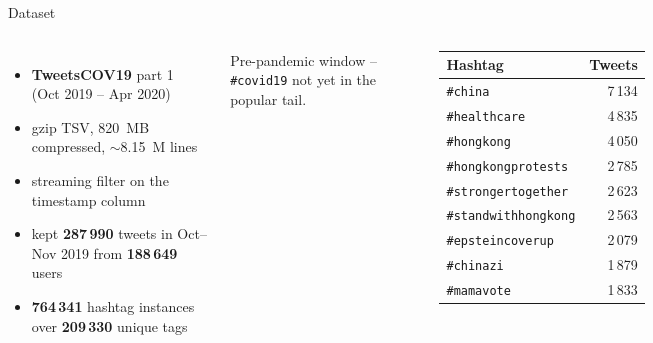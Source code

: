 \documentclass[aspectratio=169,10pt]{beamer}
\begin{document}
\begin{frame}{Dataset}
  \begin{columns}[T,onlytextwidth]
    \begin{itemize}\itemsep4pt
      \item \textbf{TweetsCOV19} part 1\\(Oct 2019 -- Apr 2020)
      \item gzip TSV, 820~MB compressed,
            \(\sim\)8.15~M lines
      \item streaming filter on the timestamp column
      \item kept \textbf{287\,990} tweets in Oct--Nov 2019
            from \textbf{188\,649} users
      \item \textbf{764\,341} hashtag instances over
            \textbf{209\,330} unique tags
    \end{itemize}
    \vspace{4pt}
    \alert{Pre-pandemic window} -- \texttt{\#covid19} not yet
    in the popular tail.
    \scriptsize
    \begin{tabular}{lr}
      \toprule
      Hashtag & Tweets \\
      \midrule
      \texttt{\#china} & 7\,134 \\
      \texttt{\#healthcare} & 4\,835 \\
      \texttt{\#hongkong} & 4\,050 \\
      \texttt{\#hongkongprotests} & 2\,785 \\
      \texttt{\#strongertogether} & 2\,623 \\
      \texttt{\#standwithhongkong} & 2\,563 \\
      \texttt{\#epsteincoverup} & 2\,079 \\
      \texttt{\#chinazi} & 1\,879 \\
      \texttt{\#mamavote} & 1\,833 \\
      \bottomrule
    \end{tabular}
  \end{columns}
\end{frame}
\end{document}

